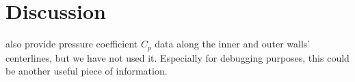 \documentclass[11pt]{article}
\begin{document}
\section{Discussion}


\citet{kim1994} also provide pressure coefficient $C_p$ data along the inner and outer walls' centerlines, but we have not used it. Especially for debugging purposes, this could be another useful piece of information.





\end{document}
